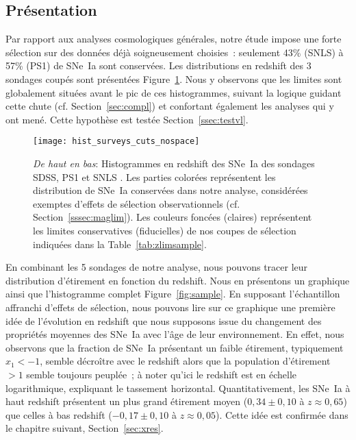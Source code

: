 \documentclass[../main/main.tex]{subfiles}
\begin{document}
\subsection{Présentation}\label{ssec:dataset}

Par rapport aux analyses cosmologiques générales, notre étude impose une forte
sélection sur des données déjà soigneusement choisies~: seulement 43\% (SNLS) à
57\% (PS1) de SNe~Ia sont conservées. Les distributions en redshift des 3
sondages coupés sont présentées Figure~\ref{fig:cuts}. Nous y observons que les
limites sont globalement situées avant le pic de ces histogrammes, suivant la
logique guidant cette chute (cf. Section~\ref{sec:compl}) et confortant
également les analyses qui y ont mené. Cette hypothèse est testée
Section~\ref{ssec:testvl}.

\begin{figure}
    \centering
    \texttt{[image: hist\_surveys\_cuts\_nospace]}
    \caption[Histogrammes des sondages coupés pour notre étude]{\textit{De haut
        en bas}: Histogrammes en redshift des SNe~Ia des sondages SDSS, PS1 et
        SNLS \citep[données de Pantheon,][]{scolnic2018}. Les parties colorées
        représentent les distribution de SNe~Ia conservées dans notre analyse,
        considérées exemptes d'effets de sélection observationnels (cf.
        Section~\ref{sssec:maglim}). Les couleurs foncées (claires) représentent
        les limites conservatives (fiducielles) de nos coupes de sélection
    indiquées dans la Table~\ref{tab:zlimsample}.}
    \label{fig:cuts}
\end{figure}

En combinant les 5 sondages de notre analyse, nous pouvons tracer leur
distribution d'étirement en fonction du redshift. Nous en présentons un
graphique ainsi que l'histogramme complet Figure~\ref{fig:sample}. En supposant
l'échantillon affranchi d'effets de sélection, nous pouvons lire sur ce
graphique une première idée de l'évolution en redshift que nous supposons issue
du changement des propriétés moyennes des SNe~Ia avec l'âge de leur
environnement. En effet, nous observons que la fraction de SNe~Ia présentant un
faible étirement, typiquement $x_1 < -1$, semble décroître avec le redshift alors
que la population d'étirement $> 1$ semble toujours peuplée~; à noter qu'ici le
redshift est en échelle logarithmique, expliquant le tassement horizontal.
Quantitativement, les SNe~Ia à haut redshift présentent un plus grand étirement
moyen ($0,34 \pm 0,10$ à $z \approx 0,65$) que celles à bas redshift ($-0,17 \pm
0,10$ à $z \approx 0,05$). Cette idée est confirmée dans le chapitre suivant,
Section~\ref{sec:xres}.
\end{document}
